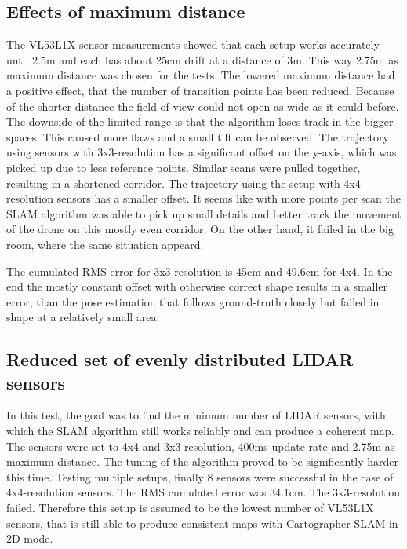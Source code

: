 \documentclass[conference]{IEEEtran}
\begin{document}
\subsection{Effects of maximum distance}

The VL53L1X sensor measurements showed that each setup works accurately until 2.5m and each has about 25cm drift at a distance of 3m. This way 2.75m as maximum distance was chosen for the tests. The lowered maximum distance had a positive effect, that the number of transition points has been reduced. Because of the shorter distance the field of view  could not open as wide as it could before. The downside of the limited range is that the algorithm loses track in the bigger spaces. This caused more flaws and a small tilt can be observed.  The trajectory using sensors with 3x3-resolution has a significant offset on the y-axis, which was picked up due to less reference points. Similar scans were pulled together, resulting in a shortened corridor. The trajectory using the setup with 4x4-resolution sensors has a smaller offset. It seems like with more points per scan the SLAM algorithm was able to pick up small details and better track the movement of the drone on this mostly even corridor. On the other hand, it failed in the big room, where the same situation appeard. 

The cumulated RMS error for 3x3-resolution is 45cm and 49.6cm for 4x4. In the end the mostly constant offset with otherwise correct shape results in a smaller error, than the pose estimation that follows ground-truth closely but failed in shape at a relatively small area. 

\subsection{Reduced set of evenly distributed LIDAR sensors}

In this test, the goal was to find the minimum number of LIDAR sensors, with which the SLAM algorithm still works reliably and can produce a coherent map. The sensors were set to 4x4 and 3x3-resolution, 400ms update rate and 2.75m as maximum distance. The tuning of the algorithm proved to be significantly harder this time. Testing multiple setups, finally 8 sensors were successful in the case of 4x4-resolution sensors. The RMS cumulated error was 34.1cm. The 3x3-resolution failed. Therefore this setup is assumed to be the lowest number of VL53L1X sensors, that is still able to produce consistent maps with Cartographer SLAM in 2D mode. 
\end{document}
